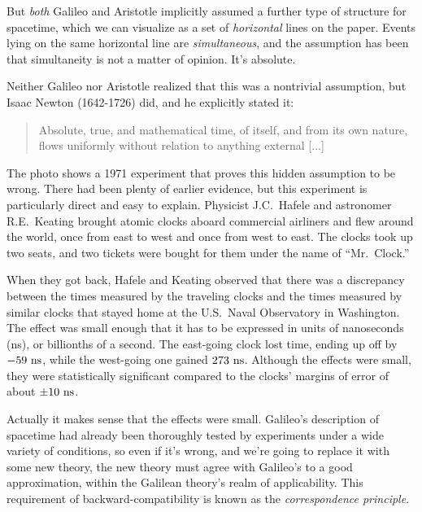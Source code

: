 But \emph{both} Galileo and Aristotle implicitly assumed a further type of structure
for spacetime, which we can visualize as a set of \emph{horizontal} lines on the paper.
Events lying on the same horizontal line are \emph{simultaneous}, and the assumption has been that
simultaneity is not a matter of opinion. It's absolute.

\pagebreak

Neither Galileo nor Aristotle realized
that this was a nontrivial assumption, but Isaac Newton (1642-1726) did, and he explicitly stated it:
%
\begin{quote}
Absolute, true, and mathematical time, of itself, and from its own nature,
flows uniformly without relation to anything external [...]
\end{quote}




The photo
shows a 1971 experiment that proves this hidden assumption to be wrong.
There had been plenty of earlier evidence, but this experiment is particularly direct and easy to explain.
Physicist J.C.~Hafele and astronomer R.E.~Keating  brought atomic clocks aboard commercial
airliners and flew around the world, once from east to west and once from west to east.
The clocks took up two seats, and two tickets were bought for them under the name of ``Mr.~Clock.''

When they got back, Hafele and Keating observed that there was a discrepancy between the times measured by the
traveling clocks and the times measured by similar clocks that stayed home at the U.S.~Naval Observatory in Washington.
The effect was small enough that it has to be expressed in units of nanoseconds (ns), or billionths of a second.
The east-going clock lost time, ending up off by $-59\ \textup{ns}$, while the west-going 
one gained $273\ \textup{ns}$. Although the effects were small, they were statistically significant compared
to the clocks' margins of error of about $\pm 10\ \zu{ns}$. 

Actually it makes sense that the effects were small.
Galileo's description of spacetime  had already been thoroughly tested by experiments under a wide variety of conditions,
so even if it's wrong, and we're going to replace it with some new theory, the
new theory must agree with Galileo's to a good approximation, within the Galilean theory's
realm of applicability. This requirement of backward-compatibility is known as
the \emph{correspondence principle}.\label{correspondence-principle-defined}

